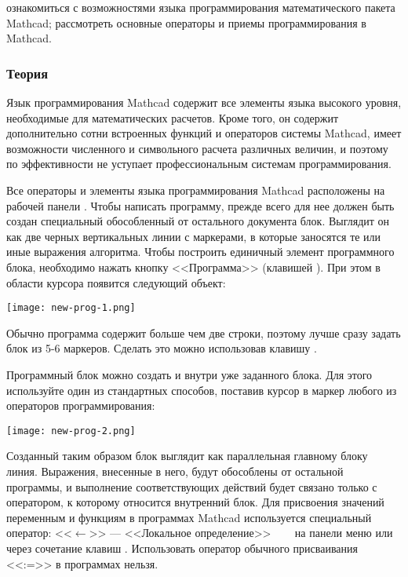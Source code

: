 
\goal ознакомиться с возможностями языка программирования математического пакета Mathcad; рассмотреть основные операторы и приемы программирования в Mathcad.

\subsubsection{Теория}
Язык программирования Mathcad содержит все элементы языка высокого уровня, необходимые для математических расчетов. Кроме того, он содержит дополнительно сотни встроенных функций и операторов системы Mathcad, имеет возможности численного и символьного расчета различных величин, и поэтому по эффективности не уступает профессиональным системам программирования.

Все операторы и элементы языка программирования Mathcad расположены на рабочей панели . 
Чтобы написать программу, прежде всего для нее должен быть создан специальный обособленный от остального документа блок. Выглядит он как две черных вертикальных линии с маркерами, в которые заносятся те или иные выражения алгоритма. Чтобы построить единичный элемент программного блока, необходимо нажать кнопку <<Программа>> (клавишей \keys{]}). При этом в области курсора появится следующий объект:
\begin{center}
	\texttt{[image: new-prog-1.png]}
\end{center}

Обычно программа содержит больше чем две строки, поэтому лучше сразу задать блок из 5-6 маркеров. Сделать это можно использовав клавишу \keys{\enter}.

Программный блок можно создать и внутри уже заданного блока. Для этого используйте один из стандартных способов, поставив курсор в маркер любого из операторов программирования:
\begin{center}
	\texttt{[image: new-prog-2.png]}
\end{center}

Созданный таким образом блок выглядит как параллельная главному блоку линия. Выражения, внесенные в него, будут обособлены от остальной программы, и выполнение соответствующих действий будет связано только с оператором, к которому относится внутренний блок.
Для присвоения значений переменным и функциям в программах Mathcad используется специальный оператор: <<$\leftarrow$>> --- <<Локальное определение>> ~~~ на панели меню 
  или через сочетание клавиш \keys{\shift + [}. Использовать оператор обычного присваивания <<:=>> в программах нельзя.

